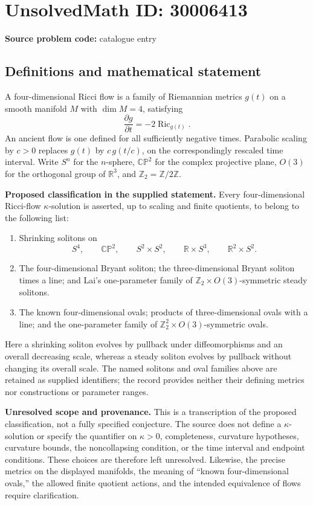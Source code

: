 \documentclass[11pt]{article}
\newcommand{\Z}{\mathbb{Z}}
\newcommand{\R}{\mathbb{R}}
\begin{document}
\section*{UnsolvedMath ID: 30006413}
\textbf{Source problem code:} catalogue entry
\subsection{Definitions and mathematical statement}
A four-dimensional Ricci flow is a family of Riemannian metrics \(g(t)\) on a smooth manifold \(M\) with \(\dim M=4\), satisfying
\[
\frac{\partial g}{\partial t}=-2\operatorname{Ric}_{g(t)}.
\]
An ancient flow is one defined for all sufficiently negative times. Parabolic scaling by \(c>0\) replaces \(g(t)\) by \(c\,g(t/c)\), on the correspondingly rescaled time interval. Write \(S^n\) for the \(n\)-sphere, \(\mathbb{CP}^2\) for the complex projective plane, \(O(3)\) for the orthogonal group of \(\R^3\), and \(\Z_2=\Z/2\Z\).

\textbf{Proposed classification in the supplied statement.} Every four-dimensional Ricci-flow \(\kappa\)-solution is asserted, up to scaling and finite quotients, to belong to the following list:
\begin{enumerate}
\item Shrinking solitons on
\[
S^4,\qquad \mathbb{CP}^2,\qquad S^2\times S^2,\qquad \R\times S^3,\qquad \R^2\times S^2.
\]
\item The four-dimensional Bryant soliton; the three-dimensional Bryant soliton times a line; and Lai's one-parameter family of \(\Z_2\times O(3)\)-symmetric steady solitons.
\item The known four-dimensional ovals; products of three-dimensional ovals with a line; and the one-parameter family of \(\Z_2^2\times O(3)\)-symmetric ovals.
\end{enumerate}
Here a shrinking soliton evolves by pullback under diffeomorphisms and an overall decreasing scale, whereas a steady soliton evolves by pullback without changing its overall scale. The named solitons and oval families above are retained as supplied identifiers; the record provides neither their defining metrics nor constructions or parameter ranges.

\textbf{Unresolved scope and provenance.} This is a transcription of the proposed classification, not a fully specified conjecture. The source does not define a \(\kappa\)-solution or specify the quantifier on \(\kappa>0\), completeness, curvature hypotheses, curvature bounds, the noncollapsing condition, or the time interval and endpoint conditions. These choices are therefore left unresolved. Likewise, the precise metrics on the displayed manifolds, the meaning of ``known four-dimensional ovals,'' the allowed finite quotient actions, and the intended equivalence of flows require clarification.
\end{document}
